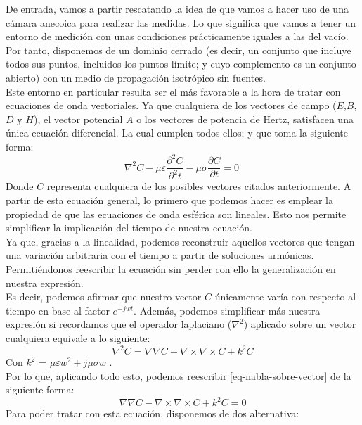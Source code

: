 \documentclass{article}
\begin{document}
De entrada, vamos a partir rescatando la idea de que vamos a hacer uso  de una cámara anecoica para realizar las medidas. Lo que significa que vamos a tener un entorno de medición con unas condiciones prácticamente iguales a las del vacío. \\
Por tanto, disponemos de un dominio cerrado (es decir,  un conjunto que incluye todos sus puntos, incluidos los puntos límite; y cuyo complemento es un conjunto abierto) con un medio de propagación isotrópico sin fuentes.\\

Este entorno en particular resulta ser el más favorable a la hora de tratar con ecuaciones de onda vectoriales. Ya que cualquiera de los vectores de campo ($E$,$B$,$D$ y $H$),  el vector potencial $A$ o  los vectores de potencia de Hertz, satisfacen una única ecuación diferencial. La cual cumplen todos ellos; y que toma la siguiente forma:
\begin{equation}
\nabla^2C - \mu\varepsilon\frac{\partial^2C}{\partial^2{t}} - \mu\sigma\frac{\partial C}{\partial{t}} = 0\
\label{eq-esfvec-general}
\end{equation}
Donde $C$ representa cualquiera de los posibles vectores citados anteriormente.\newpage
A partir de esta ecuación general, lo primero que podemos hacer es emplear la propiedad de que las ecuaciones de onda esférica son lineales. Esto nos permite simplificar la implicación del tiempo de nuestra ecuación.\\
Ya que, gracias a la linealidad, podemos reconstruir aquellos vectores que tengan una variación arbitraria con el tiempo a partir de soluciones armónicas. Permitiéndonos reescribir la ecuación sin perder con ello la generalización en nuestra expresión. \\

Es decir, podemos afirmar que nuestro vector  $C$ únicamente varía con respecto al tiempo en base al factor $e^{-jwt}$. 
Además, podemos simplificar más nuestra expresión si recordamos que el operador laplaciano ($\nabla^2$) aplicado sobre un vector cualquiera equivale a lo siguiente:
\begin{equation}
\nabla^2C =\nabla\nabla C - \nabla\times\nabla\times C + k^2C
\label{eq-nabla-sobre-vector}
\end{equation}
Con $k^2$ = $\mu\varepsilon w^2 + j\mu\sigma w$ .\\

Por lo que, aplicando todo esto, podemos reescribir  \eqref{eq-nabla-sobre-vector} de la siguiente forma:
\begin{equation}
\nabla\nabla C - \nabla \times \nabla \times C + k^2 C = 0\label{eq-esfvec-simplificada}
\end{equation}
Para poder tratar con esta ecuación, disponemos de dos alternativa: 
\end{document}
